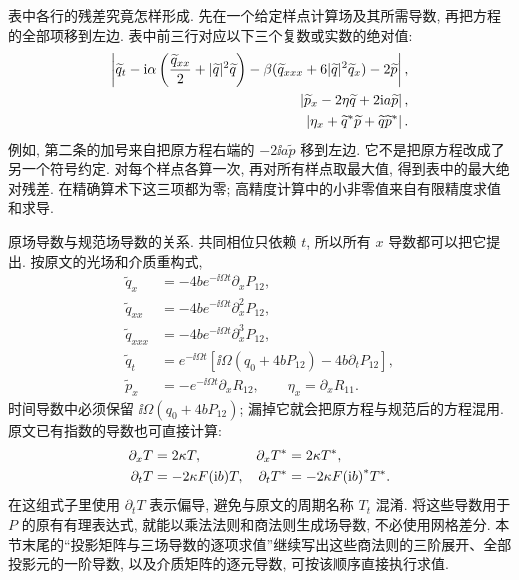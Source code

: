 \par\smallskip\noindent 表中各行的残差究竟怎样形成.\quad
先在一个给定样点计算场及其所需导数, 再把方程的全部项移到左边. 表中前三行对应以下三个复数或实数的绝对值:
\begin{align*}
\left|\widetilde q_t
-\mathrm{i}\alpha\left(\dfrac{\widetilde q_{xx}}{2}+|\widetilde q|^2\widetilde q\right)
-\beta(\widetilde q_{xxx}+6|\widetilde q|^2\widetilde q_x)-2\widetilde p\right|,\\
\left|\widetilde p_x-2\eta\widetilde q+2\mathrm{i} a\widetilde p\right|,\\
\left|\eta_x+{\widetilde q}^{*}\widetilde p+\widetilde q{\widetilde p}^{*}\right|.
\end{align*}
例如, 第二条的加号来自把原方程右端的 $-2\ii a\widetilde p$ 移到左边. 它不是把原方程改成了另一个符号约定. 对每个样点各算一次, 再对所有样点取最大值, 得到表中的最大绝对残差. 在精确算术下这三项都为零; 高精度计算中的小非零值来自有限精度求值和求导.

\par\smallskip\noindent 原场导数与规范场导数的关系.\quad
共同相位只依赖 $t$, 所以所有 $x$ 导数都可以把它提出. 按原文的光场和介质重构式,
\begin{align*}
\widetilde q_x&=-4b e^{-\ii\Omega t}\partial_xP_{12},\\
\widetilde q_{xx}&=-4b e^{-\ii\Omega t}\partial_x^2P_{12},\\
\widetilde q_{xxx}&=-4b e^{-\ii\Omega t}\partial_x^3P_{12},\\
\widetilde q_t
&=e^{-\ii\Omega t}\left[\ii\Omega(q_0+4bP_{12})-4b\partial_tP_{12}\right],\\
\widetilde p_x&=-e^{-\ii\Omega t}\partial_xR_{12},\qquad
\eta_x=\partial_xR_{11}.
\end{align*}
时间导数中必须保留 $\ii\Omega(q_0+4bP_{12})$; 漏掉它就会把原方程与规范后的方程混用. 原文已有指数的导数也可直接计算:
\begin{align*}
\partial_xT&=2\kappa T,&
\partial_x{T}^{*}&=2\kappa{T}^{*},\\
\partial_tT&=-2\kappa F(\mathrm{i} b)T,&
\partial_t{T}^{*}&=-2\kappa{F(\mathrm{i}b)}^{*}{T}^{*}.
\end{align*}
在这组式子里使用 $\partial_tT$ 表示偏导, 避免与原文的周期名称 $T_t$ 混淆. 将这些导数用于 $P$ 的原有有理表达式, 就能以乘法法则和商法则生成场导数, 不必使用网格差分.
本节末尾的``投影矩阵与三场导数的逐项求值''继续写出这些商法则的三阶展开、全部投影元的一阶导数, 以及介质矩阵的逐元导数, 可按该顺序直接执行求值.

